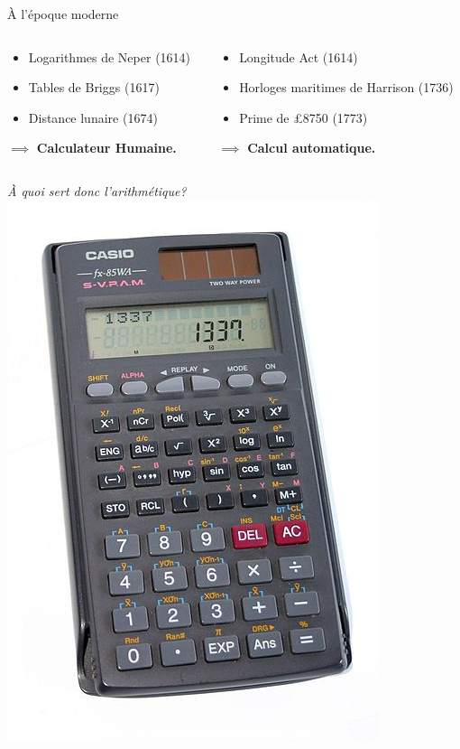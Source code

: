 \begin{frame}{À l'époque moderne}
\begin{columns}
\begin{column}{0.40\linewidth}
	\end{column}
\end{columns}
\begin{columns}
	\begin{column}{0.49\linewidth}
		\begin{itemize}
			\item Logarithmes de Neper (1614)
			\item Tables de Briggs (1617)
			\item Distance lunaire (1674)
		\end{itemize}
		$\implies$ \textbf{Calculateur Humaine.}
	\end{column}
	\begin{column}{0.49\linewidth}
		\begin{itemize}
			\item Longitude Act (1614) 
			\item Horloges maritimes de Harrison (1736)
			\item Prime de £8750 (1773)
		\end{itemize}
		$\implies$ \textbf{Calcul automatique.}
	\end{column}
\end{columns}
\end{frame}
\begin{frame}
\centering
\huge \emph{À quoi sert donc l'arithmétique?}
\vfill
\centering
\includegraphics[height=0.5\paperheight]{../resources/illustrations/calculator} \\
\vfill
\end{frame}
